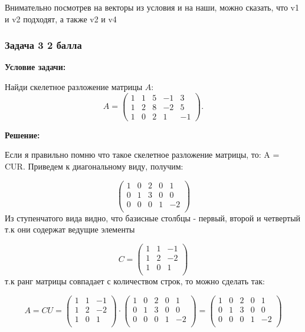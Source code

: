 \documentclass[a4paper,12pt]{article}
\begin{document}
Внимательно посмотрев на векторы из условия и на наши, можно сказать, что v1 и v2 подходят, а также v2 и v4

\subsubsection{Задача 3 \hfill 2 балла}
\textbf{Условие задачи:}

Найди скелетное разложение матрицы \( A \):
\[
A =
\begin{pmatrix}
1 & 1 & 5 & -1 & 3 \\
1 & 2 & 8 & -2 & 5 \\
1 & 0 & 2 & 1 & -1
\end{pmatrix}.
\]

\textbf{Решение:}

Если я правильно помню что такое скелетное разложение матрицы, то: A = CUR. Приведем к диагональному виду, получим:

\[
\begin{pmatrix}
1 & 0 & 2 & 0 & 1 \\
0 & 1 & 3 & 0 & 0 \\
0 & 0 & 0 & 1 & -2 \\
\end{pmatrix}
\]
Из ступенчатого вида видно, что базисные столбцы - первый, второй и четвертый т.к они содержат ведущие элементы

\[
C =
\begin{pmatrix}
1 & 1 & -1 \\
1 & 2 & -2 \\
1 & 0 & 1 \\
\end{pmatrix}
\]
т.к ранг матрицы совпадает с количеством строк, то можно сделать так: 

\[
A = CU = \begin{pmatrix}
1 & 1 & -1 \\
1 & 2 & -2 \\
1 & 0 & 1 \\
\end{pmatrix} \cdot 
\begin{pmatrix}
1 & 0 & 2 & 0 & 1 \\
0 & 1 & 3 & 0 & 0 \\
0 & 0 & 0 & 1 & -2 \\
\end{pmatrix} = 
\begin{pmatrix}
1 & 0 & 2 & 0 & 1 \\
0 & 1 & 3 & 0 & 0 \\
0 & 0 & 0 & 1 & -2 \\
\end{pmatrix}
\]
\end{document}
